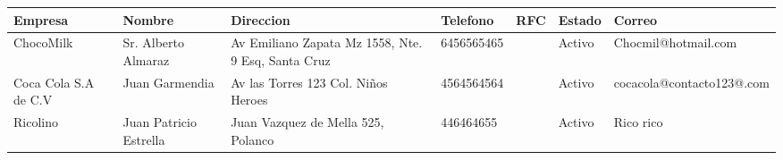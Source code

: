 \documentclass[a4paper,12pt]{article}
\begin{document}
\footnotesize  
\setlength\LTleft{-30pt}
 \setlength\LTright{-100pt}
  \begin{landscape}
 \thispagestyle{empty}
\begin{longtable}{|p{2.5cm}|p{2.5cm}|p{2.5cm}|p{2cm}|p{5cm}|p{1cm}|p{5cm}|}
\hline
\textbf{Empresa} & \textbf{Nombre} & \textbf{Direccion} & \textbf{Telefono} & \textbf{RFC} & \textbf{Estado} & \textbf{Correo}\\ \hline \hline ChocoMilk & Sr. Alberto Almaraz & Av Emiliano Zapata Mz 1558, Nte. 9 Esq, Santa Cruz & 6456565465 &  & Activo & Chocmil@hotmail.com \\ \hline 
Coca Cola S.A de C.V & Juan Garmendia & Av las Torres 123 Col. Niños Heroes & 4564564564 &  & Activo & cocacola@contacto123@.com \\ \hline 
Ricolino & Juan Patricio Estrella & Juan Vazquez de Mella 525, Polanco & 446464655 &  & Activo & Rico rico \\ \hline 
\end{longtable}
\thispagestyle{empty}
\end{landscape}
\end{document}
